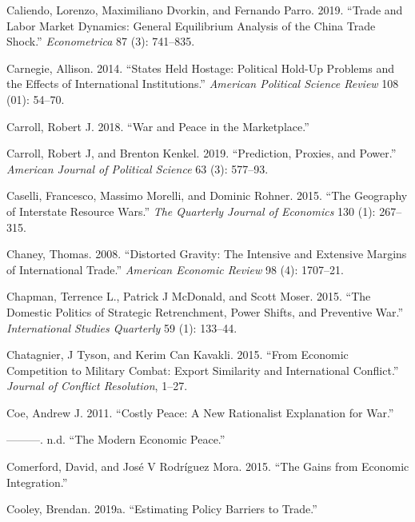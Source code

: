 \documentclass{puthesis}
\newlength{\cslhangindent}
\newenvironment{cslreferences}%
  {\setlength{\parindent}{0pt}%
  \everypar{\setlength{\hangindent}{\cslhangindent}}\ignorespaces}%
  {\par}
\begin{document}
\begin{cslreferences}
\leavevmode\hypertarget{ref-Caliendo2019}{}%
Caliendo, Lorenzo, Maximiliano Dvorkin, and Fernando Parro. 2019.
``Trade and Labor Market Dynamics: General Equilibrium Analysis of the
China Trade Shock.'' \emph{Econometrica} 87 (3): 741--835.

\leavevmode\hypertarget{ref-Carnegie2014}{}%
Carnegie, Allison. 2014. ``States Held Hostage: Political Hold-Up
Problems and the Effects of International Institutions.'' \emph{American
Political Science Review} 108 (01): 54--70.

\leavevmode\hypertarget{ref-Carroll2018}{}%
Carroll, Robert J. 2018. ``War and Peace in the Marketplace.''

\leavevmode\hypertarget{ref-Carroll2019}{}%
Carroll, Robert J, and Brenton Kenkel. 2019. ``Prediction, Proxies, and
Power.'' \emph{American Journal of Political Science} 63 (3): 577--93.

\leavevmode\hypertarget{ref-Caselli2015}{}%
Caselli, Francesco, Massimo Morelli, and Dominic Rohner. 2015. ``The
Geography of Interstate Resource Wars.'' \emph{The Quarterly Journal of
Economics} 130 (1): 267--315.

\leavevmode\hypertarget{ref-Chaney2008}{}%
Chaney, Thomas. 2008. ``Distorted Gravity: The Intensive and Extensive
Margins of International Trade.'' \emph{American Economic Review} 98
(4): 1707--21.

\leavevmode\hypertarget{ref-Chapman2015}{}%
Chapman, Terrence L., Patrick J McDonald, and Scott Moser. 2015. ``The
Domestic Politics of Strategic Retrenchment, Power Shifts, and
Preventive War.'' \emph{International Studies Quarterly} 59 (1):
133--44.

\leavevmode\hypertarget{ref-Chatagnier2015}{}%
Chatagnier, J Tyson, and Kerim Can Kavakli. 2015. ``From Economic
Competition to Military Combat: Export Similarity and International
Conflict.'' \emph{Journal of Conflict Resolution}, 1--27.

\leavevmode\hypertarget{ref-Coe2011}{}%
Coe, Andrew J. 2011. ``Costly Peace: A New Rationalist Explanation for
War.''

\leavevmode\hypertarget{ref-CoeND}{}%
---------. n.d. ``The Modern Economic Peace.''

\leavevmode\hypertarget{ref-Comerford2015}{}%
Comerford, David, and José V Rodríguez Mora. 2015. ``The Gains from
Economic Integration.''

\leavevmode\hypertarget{ref-Cooley2019b}{}%
Cooley, Brendan. 2019a. ``Estimating Policy Barriers to Trade.''


\end{cslreferences}
\end{document}
